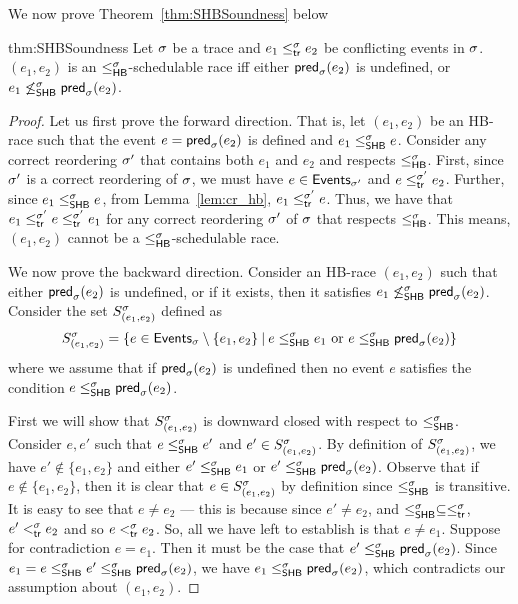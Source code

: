 We now prove Theorem~\ref{thm:SHBSoundness} below
\begin{reptheorem}{thm:SHBSoundness}
Let $\sigma$ be a trace and $e_1 \leq^{\sigma}_{\mathsf{tr}} e_2$ be conflicting events in $\sigma$.
$(e_1, e_2)$ is an $\leq^{\sigma}_{\mathsf{HB}}$-schedulable race iff 
either $\mathsf{pred}_{\sigma}(e_2)$ is undefined, or $e_1 \not\leq^\sigma_{\mathsf{SHB}} \mathsf{pred}_{\sigma}(e_2)$.
\end{reptheorem}

\begin{proof}
Let us first prove the forward direction.
That is, let $(e_1,e_2)$ be an HB-race such that the
event $e = \mathsf{pred}_{\sigma}(e_2)$ is defined and $e_1 \leq^{\sigma}_{\mathsf{SHB}} e$. 
Consider any correct reordering $\sigma'$ that contains both
$e_1$ and $e_2$ and respects $\leq^{\sigma}_{\mathsf{HB}}$. 
First, since $\sigma'$ is a correct reordering of $\sigma$, we must have
$e \in \mathsf{Events}_{\sigma'}$ and $e \leq^{\sigma'}_{\mathsf{tr}} e_2$.
Further, since $e_1 \leq^{\sigma}_{\mathsf{SHB}} e$, from Lemma~\ref{lem:cr_hb}, 
$e_1 \leq^{\sigma'}_{\mathsf{tr}} e$.
Thus, we have that $e_1 \leq^{\sigma'}_{\mathsf{tr}} e \leq^{\sigma'}_{\mathsf{tr}} e_1$
for any correct reordering $\sigma'$ of $\sigma$ that respects $\leq^{\sigma}_{\mathsf{HB}}$.
This means, $(e_1, e_2)$ cannot be a $\leq^{\sigma}_{\mathsf{HB}}$-schedulable race.

We now prove the backward direction.
Consider an HB-race $(e_1,e_2)$ such that 
either $\mathsf{pred}_{\sigma}(e_2)$ is undefined, or if it exists, then it satisfies 
$e_1 \not\leq^\sigma_{\mathsf{SHB}} \mathsf{pred}_{\sigma}(e_2)$.
Consider the set $S^\sigma_{(e_1,e_2)}$ defined as
\[
S^\sigma_{(e_1,e_2)} = \{e \in \mathsf{Events}_{\sigma} \setminus\{e_1,e_2\}\: |\: 
        e \leq^{\sigma}_{\mathsf{SHB}} e_1 \mbox{ or } 
        e \leq^{\sigma}_{\mathsf{SHB}} \mathsf{pred}_{\sigma}(e_2)\}
\]
where we assume that if $\mathsf{pred}_{\sigma}(e_2)$ is undefined then no event
$e$ satisfies the condition $e \leq^{\sigma}_{\mathsf{SHB}} \mathsf{pred}_{\sigma}(e_2)$.

First we will show that $S^\sigma_{(e_1,e_2)}$ is downward closed with respect to
$\leq^{\sigma}_{\mathsf{SHB}}$. Consider $e,e'$ such that $e \leq^{\sigma}_{\mathsf{SHB}} e'$ and
$e' \in S^\sigma_{(e_1,e_2)}$. By definition of $S^\sigma_{(e_1,e_2)}$, we have
$e' \not\in \{e_1,e_2\}$ and either $e' \leq^{\sigma}_{\mathsf{SHB}} e_1$ or
$e' \leq^{\sigma}_{\mathsf{SHB}} \mathsf{pred}_{\sigma}(e_2)$. Observe that if
$e \not\in \{e_1,e_2\}$, then it is clear that $e \in S^\sigma_{(e_1,e_2)}$ by
definition since $\leq^{\sigma}_{\mathsf{SHB}}$ is transitive. It is easy to see that
$e \neq e_2$ --- this is because since $e' \neq e_2$, and
$\leq^{\sigma}_{\mathsf{SHB}} \subseteq \leq^{\sigma}_{\mathsf{tr}}$, $e' <^{\sigma}_{\mathsf{tr}} e_2$ and so
$e <^{\sigma}_{\mathsf{tr}} e_2$. So, all we have left to establish is that
$e \neq e_1$. Suppose for contradiction $e = e_1$. Then it must be the
case that $e' \leq^{\sigma}_{\mathsf{SHB}} \mathsf{pred}_{\sigma}(e_2)$. Since $e_1 = e \leq^{\sigma}_{\mathsf{SHB}}
e' \leq^{\sigma}_{\mathsf{SHB}} \mathsf{pred}_{\sigma}(e_2)$, we have
$e_1 \leq^{\sigma}_{\mathsf{SHB}} \mathsf{pred}_{\sigma}(e_2)$, which contradicts our assumption
about $(e_1,e_2)$.


\end{proof}
